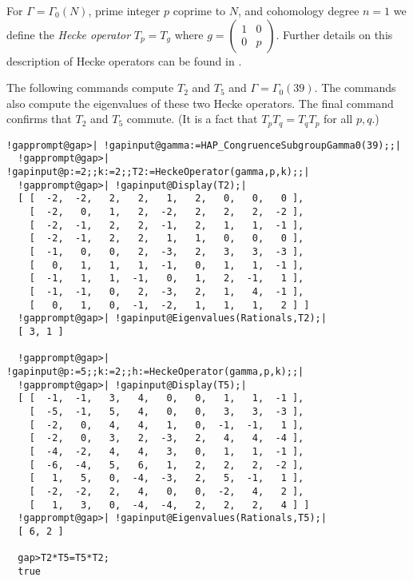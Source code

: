 \documentclass[a4paper,11pt]{report}
\begin{document}
{{For $\Gamma=\Gamma_0(N)$, prime integer $p$ coprime to $N$, and cohomology degree $n=1$ we define the \emph{Hecke operator} $T_p =T_g$ where $g=\left(\begin{array}{cc}1&0\\0&p\end{array}\right)$. Further details on this description of Hecke operators can be found in \cite[Appendix by P. Gunnells]{stein}. 

The following commands compute $T_2$ and $T_5$ and $\Gamma=\Gamma_0(39)$. The commands also compute the eigenvalues of these two Hecke operators. The
final command confirms that $T_2$ and $T_5$ commute. (It is a fact that $T_pT_q=T_qT_p$ for all $p,q$.) 
\begin{Verbatim}[commandchars=!@|,fontsize=\small,frame=single,label=Example]
  !gapprompt@gap>| !gapinput@gamma:=HAP_CongruenceSubgroupGamma0(39);;|
  !gapprompt@gap>| !gapinput@p:=2;;k:=2;;T2:=HeckeOperator(gamma,p,k);;|
  !gapprompt@gap>| !gapinput@Display(T2);|
  [ [  -2,  -2,   2,   2,   1,   2,   0,   0,   0 ],
    [  -2,   0,   1,   2,  -2,   2,   2,   2,  -2 ],
    [  -2,  -1,   2,   2,  -1,   2,   1,   1,  -1 ],
    [  -2,  -1,   2,   2,   1,   1,   0,   0,   0 ],
    [  -1,   0,   0,   2,  -3,   2,   3,   3,  -3 ],
    [   0,   1,   1,   1,  -1,   0,   1,   1,  -1 ],
    [  -1,   1,   1,  -1,   0,   1,   2,  -1,   1 ],
    [  -1,  -1,   0,   2,  -3,   2,   1,   4,  -1 ],
    [   0,   1,   0,  -1,  -2,   1,   1,   1,   2 ] ]
  !gapprompt@gap>| !gapinput@Eigenvalues(Rationals,T2);|
  [ 3, 1 ]
  
  !gapprompt@gap>| !gapinput@p:=5;;k:=2;;h:=HeckeOperator(gamma,p,k);;|
  !gapprompt@gap>| !gapinput@Display(T5);|
  [ [  -1,  -1,   3,   4,   0,   0,   1,   1,  -1 ],
    [  -5,  -1,   5,   4,   0,   0,   3,   3,  -3 ],
    [  -2,   0,   4,   4,   1,   0,  -1,  -1,   1 ],
    [  -2,   0,   3,   2,  -3,   2,   4,   4,  -4 ],
    [  -4,  -2,   4,   4,   3,   0,   1,   1,  -1 ],
    [  -6,  -4,   5,   6,   1,   2,   2,   2,  -2 ],
    [   1,   5,   0,  -4,  -3,   2,   5,  -1,   1 ],
    [  -2,  -2,   2,   4,   0,   0,  -2,   4,   2 ],
    [   1,   3,   0,  -4,  -4,   2,   2,   2,   4 ] ]
  !gapprompt@gap>| !gapinput@Eigenvalues(Rationals,T5);|
  [ 6, 2 ]
  
  gap>T2*T5=T5*T2;
  true
  
\end{Verbatim}
 }

 
}
\end{document}
